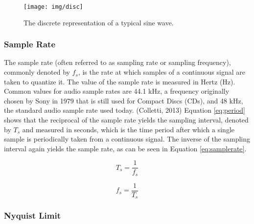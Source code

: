 \begin{figure}[h!]

  \centering

  \texttt{[image: img/disc]}

  \caption{The discrete representation of a typical sine wave.}

  \label{fig:disc}

\end{figure}

\subsubsection{Sample Rate}

The sample rate (often referred to as sampling rate or sampling frequency), commonly denoted by $f_{s}$, is the rate at which samples of a continuous signal are taken to quantize it. The value of the sample rate is measured in Hertz (Hz). Common values for audio sample rates are 44.1 kHz, a frequency originally chosen by Sony in 1979 that is still used for Compact Discs (CDs), and 48 kHz, the standard audio sample rate used today.  (Colletti, 2013) Equation \ref{eq:period} shows that the reciprocal of the sample rate yields the sampling interval, denoted by $T_{s}$ and measured in seconds, which is the time period after which a single sample is periodically taken from a continuous signal. The inverse of the sampling interval again yields the sample rate, as can be seen in Equation \ref{eq:samplerate}.

\begin{multicols}{2}

  \begin{equation}
     T_{s} = \frac{1}{f_{s}}
     \label{eq:period}
  \end{equation}

  \begin{equation}
    f_{s} = \frac{1}{T_{s}}
    \label{eq:samplerate}
  \end{equation}

\end{multicols}

\pagebreak

\subsubsection{Nyquist Limit}

